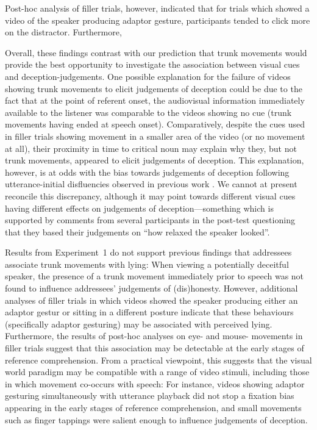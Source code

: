 \documentclass[a4paper,man,natbib]{apa6}
\newcommand*{\spex}[1]{``{#1}''} %
\begin{document}
Post-hoc analysis of filler trials, however, indicated that for trials which showed a video of the speaker producing adaptor gesture, participants tended to click more on the distractor.
Furthermore, 


Overall, these findings contrast with our prediction that trunk movements would provide the best opportunity to investigate the association between visual cues and deception-judgements.
One possible explanation for the failure of videos showing trunk movements to elicit judgements of deception could be due to the fact that at the point of referent onset, the audiovisual information immediately available to the listener was comparable to the videos showing no cue (trunk movements having ended at speech onset).
Comparatively, despite the cues used in filler trials showing movement in a smaller area of the video (or no movement at all), their proximity in time to critical noun may explain why they, but not trunk movements, appeared to elicit judgements of deception. %
This explanation, however, is at odds with the bias towards judgements of deception following utterance-initial disfluencies observed in previous work \citep[][Experiment~1]{Loy2017}.
We cannot at present reconcile this discrepancy, although it may point towards different visual cues having different effects on judgements of deception---something which is supported by comments from several participants in the post-test questioning that they based their judgements on \spex{how relaxed the speaker looked}.

Results from Experiment~1 do not support previous findings that addressees associate trunk movements with lying: When viewing a potentially deceitful speaker, the presence of a trunk movement immediately prior to speech was not found to influence addressees' judgements of (dis)honesty. 
However, additional analyses of filler trials in which videos showed the speaker producing either an adaptor gestur or sitting in a different posture indicate that these behaviours (specifically adaptor gesturing) may be associated with perceived lying.
Furthermore, the results of post-hoc analyses on eye- and mouse- movements in filler trials suggest that this association may be detectable at the early stages of reference comprehension. 
From a practical viewpoint, this suggests that the visual world paradigm may be compatible with a range of video stimuli, including those in which movement co-occurs with speech: For instance, videos showing adaptor gesturing simultaneously with utterance playback did not stop a fixation bias appearing in the early stages of reference comprehension, and small movements such as finger tappings were salient enough to influence judgements of deception.
\end{document}

